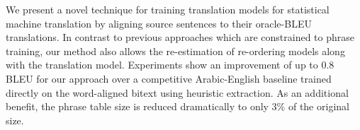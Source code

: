 We present a novel technique for training translation models for statistical machine translation by aligning source sentences to their oracle-BLEU translations. In contrast to previous approaches which are constrained to phrase training, our method also allows the re-estimation of re-ordering models along with the translation model. Experiments show an improvement of up to 0.8 BLEU for our approach over a competitive Arabic-English baseline trained directly on the word-aligned bitext using heuristic extraction. As an additional benefit, the phrase table size is reduced dramatically to only 3\% of the original size.
